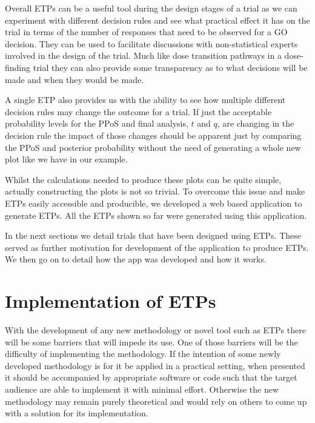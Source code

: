 Overall ETPs can be a useful tool during the design stages of a trial as we can experiment with different decision rules and see what practical effect it has on the trial in terms of the number of responses that need to be observed for a GO decision. They can be used to facilitate discussions with non-statistical experts involved in the design of the trial. Much like dose transition pathways in a dose-finding trial they can also provide some transparency as to what decisions will be made and when they would be made. 

A single ETP also provides us with the ability to see how multiple different decision rules may change the outcome for a trial. If just the acceptable probability levels for the PPoS and final analysis, $t$ and $q$, are changing in the decision rule the impact of those changes should be apparent just by comparing the PPoS and posterior probability without the need of generating a whole new plot like we have in our example.

Whilst the calculations needed to produce these plots can be quite simple, actually constructing the plots is not so trivial. To overcome this issue and make ETPs easily accessible and producible, we developed a web based application to generate ETPs. All the ETPs shown so far were generated using this application. 

In the next sections we detail trials that have been designed using ETPs. These served as further motivation for development of the application to produce ETPs. We then go on to detail how the app was developed and how it works.    


\section{Implementation of ETPs}

With the development of any new methodology or novel tool such as ETPs there will be some barriers that will impede its use. One of those barriers will be the difficulty of implementing the methodology. If the intention of some newly developed methodology is for it be applied in a practical setting, when presented it should be accompanied by appropriate software or code such that the target audience are able to implement it with minimal effort. Otherwise the new methodology may remain purely theoretical and would rely on others to come up with a solution for its implementation. 

